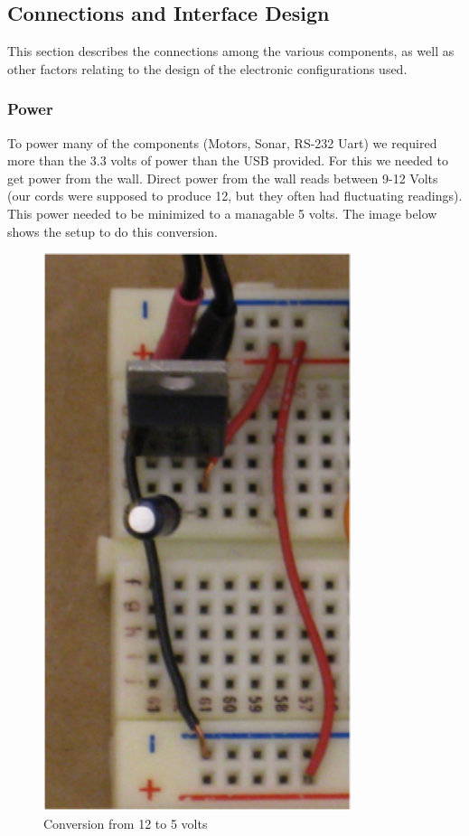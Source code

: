 \subsection{Connections and Interface Design}
This section describes the connections among the various components, as well as other factors relating to the design of the electronic configurations used.  

\subsubsection{Power}
To power many of the components (Motors, Sonar, RS-232 Uart) we required more than the 3.3 volts of power than the USB provided. For this we needed to get power from the wall. Direct power from the wall reads between 9-12 Volts (our cords were supposed to produce 12, but they often had fluctuating readings).  This power needed to be minimized to a managable 5 volts.  The image below shows the setup to do this conversion.
\begin{figure}[h]
  \begin{center}
    \includegraphics[width=90mm]{imageSources/power12to5.png}
  \end{center}
  \caption{Conversion from 12 to 5 volts} 
  \label{power12to5}
\end{figure}

